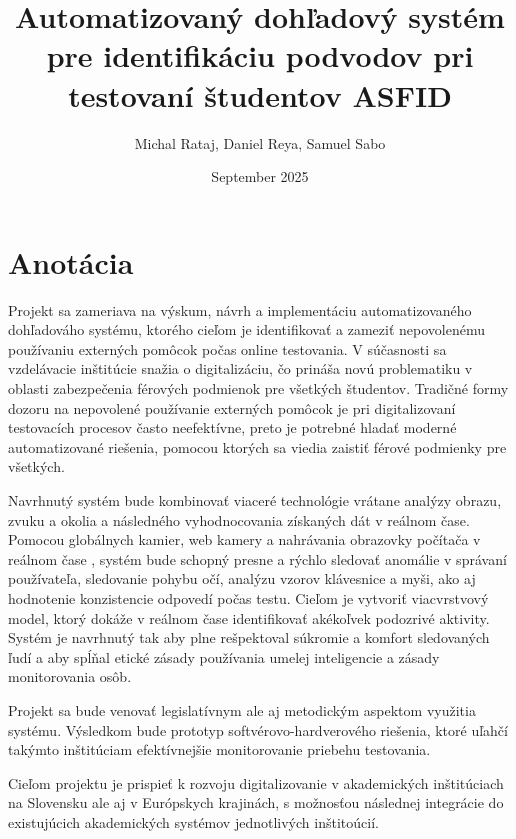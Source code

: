 \documentclass{article}
\title{Automatizovaný dohľadový systém pre identifikáciu podvodov pri testovaní študentov ASFID}
\author{Michal Rataj, Daniel Reya, Samuel Sabo}
\date{September 2025}
\begin{document}
\maketitle
\section{Anotácia}
Projekt sa zameriava na výskum, návrh a implementáciu automatizovaného dohľadováho systému, ktorého cieľom je identifikovať a zameziť nepovolenému používaniu externých pomôcok počas online testovania. V súčasnosti sa vzdelávacie inštitúcie snažia o digitalizáciu, čo prináša novú problematiku v oblasti zabezpečenia férových podmienok pre všetkých študentov. Tradičné formy dozoru na nepovolené používanie externých pomôcok je pri digitalizovaní testovacích procesov často neefektívne, preto je potrebné hladať moderné automatizované riešenia, pomocou ktorých sa viedia zaistiť férové podmienky pre všetkých.\hfill \break

Navrhnutý systém bude kombinovať viaceré technológie vrátane analýzy obrazu, zvuku a okolia a následného vyhodnocovania získaných dát v reálnom čase. Pomocou globálnych kamier, web kamery a nahrávania obrazovky počítača v reálnom čase , systém bude schopný presne a rýchlo sledovať anomálie v správaní používateľa, sledovanie pohybu očí, analýzu vzorov klávesnice a myši, ako aj hodnotenie konzistencie odpovedí počas testu. Cieľom je vytvoriť viacvrstvový model, ktorý dokáže v reálnom čase identifikovať akékoľvek podozrivé aktivity. Systém je navrhnutý tak aby plne rešpektoval súkromie a komfort sledovaných ľudí a aby spĺňal etické zásady používania umelej inteligencie a zásady monitorovania osôb.\hfill \break


Projekt sa bude venovať legislatívnym ale aj metodickým aspektom využitia systému. Výsledkom bude prototyp softvérovo-hardverového riešenia, ktoré uľahčí takýmto inštitúciam efektívnejšie monitorovanie priebehu testovania. \hfill \break


Cieľom projektu je prispieť k rozvoju digitalizovanie v akademických inštitúciach na Slovensku ale aj v Európskych krajinách, s možnosťou následnej integrácie do existujúcich akademických systémov jednotlivých inštitoúcií.\hfill \break
\end{document}
